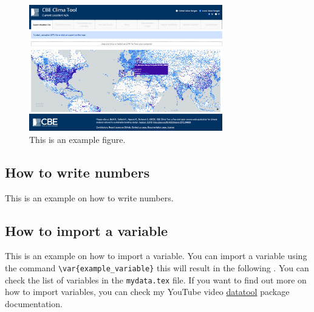 \begin{figure}[htb!]
    \centering
    \includegraphics[width=0.75\textwidth]{figures/example_clima}
    \caption{This is an example figure.}
    \label{fig:example}
\end{figure}

\subsection{How to write numbers}\label{subsec:how-to-write-numbers}
This is an example on how to write numbers.

\subsection{How to import a variable}\label{subsec:how-to-import-a-variable}
This is an example on how to import a variable.
You can import a variable using the command \verb!\var{example_variable}! this will result in the following .
You can check the list of variables in the \texttt{mydata.tex} file.
If you want to find out more on how to import variables, you can check my YouTube video \href{https://ctan.org/pkg/datatool}{datatool} package documentation.